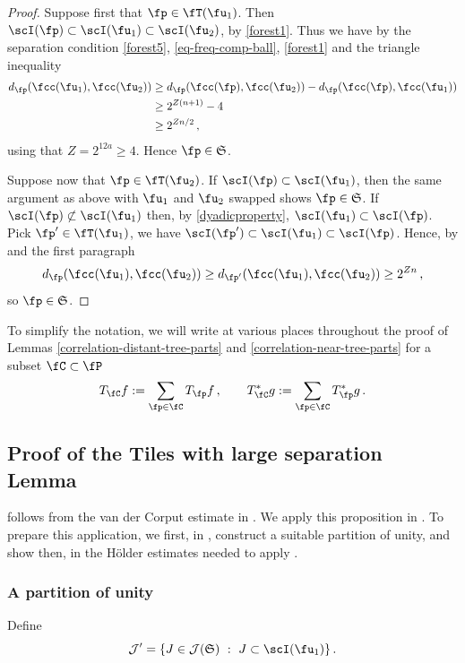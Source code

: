 \begin{proof}
    \leanok
    Suppose first that $\fp \in \fT(\fu_1)$. Then $\scI(\fp) \subset \scI(\fu_1) \subset \scI(\fu_2)$, by \eqref{forest1}. Thus we have by the separation condition \eqref{forest5}, \eqref{eq-freq-comp-ball}, \eqref{forest1} and the triangle inequality
    \begin{align*}
        d_{\fp}(\fcc(\fu_1), \fcc(\fu_2)) &\ge d_{\fp}(\fcc(\fp), \fcc(\fu_2)) - d_{\fp}(\fcc(\fp), \fcc(\fu_1))\\
        &\ge 2^{Z(n+1)} - 4\\
        &\ge 2^{Zn/2}\,,
    \end{align*}
    using that $Z= 2^{12a}\ge 4$. Hence $\fp \in \mathfrak{S}$.

    Suppose now that $\fp \in \fT(\fu_2)$. If $\scI(\fp) \subset \scI(\fu_1)$, then the same argument as above with $\fu_1$ and $\fu_2$ swapped shows $\fp \in \mathfrak{S}$. If $\scI(\fp) \not \subset \scI(\fu_1)$ then, by \eqref{dyadicproperty}, $\scI(\fu_1) \subset \scI(\fp)$. Pick $\fp' \in \fT(\fu_1)$, we have $\scI(\fp') \subset \scI(\fu_1) \subset \scI(\fp)$. Hence, by  and the first paragraph
    $$
        d_{\fp}(\fcc(\fu_1), \fcc(\fu_2)) \ge d_{\fp'}(\fcc(\fu_1), \fcc(\fu_2)) \ge 2^{Zn}\,,
    $$
    so $\fp \in \mathfrak{S}$.
\end{proof}

To simplify the notation, we will write at various places throughout the proof of Lemmas \ref{correlation-distant-tree-parts} and \ref{correlation-near-tree-parts} for a subset $\fC \subset \fP$
$$
    T_{\fC} f := \sum_{\fp \in \fC} T_{\fp} f\,, \quad\quad T_{\fC}^* g := \sum_{\fp\in\fC} T_{\fp}^* g\,.
$$

\subsection{Proof of the Tiles with large separation Lemma}
    \label{subsec-big-tiles}

 follows from the van der Corput estimate in . We apply this proposition in . To prepare this application, we first, in , construct a suitable partition of unity, and show then, in  the H\"older estimates needed to apply .

\subsubsection{A partition of unity}
\label{subsubsec-pao}
    Define
    $$
        \mathcal{J}' = \{J \in \mathcal{J}(\mathfrak{S}) \ : \ J \subset \scI(\fu_1)\}\,.
    $$

